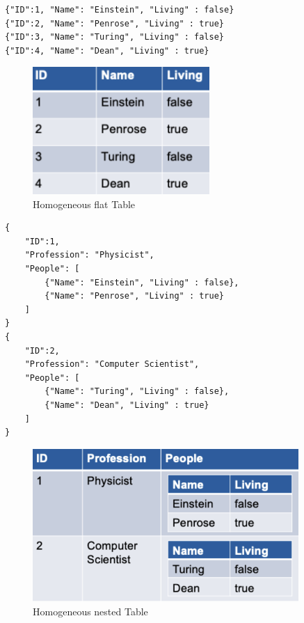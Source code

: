 \begin{minipage}{0.55\textwidth}
\vspace{1\baselineskip}
\begin{lstlisting}[style=json,caption={JSON Code for a homogeneous and flat table.}]
{"ID":1, "Name": "Einstein", "Living" : false}
{"ID":2, "Name": "Penrose", "Living" : true}
{"ID":3, "Name": "Turing", "Living" : false}
{"ID":4, "Name": "Dean", "Living" : true}
\end{lstlisting}
\end{minipage}
\hfill
\begin{minipage}{0.45\textwidth}
\begin{figure}[H]
    \centering
    \includegraphics[width=0.6\textwidth]{Figures/FlatHomogeneous.png}
    \caption{Homogeneous flat Table}
\end{figure}
\end{minipage}

\begin{minipage}{0.55\textwidth}
\vspace{1\baselineskip}
\begin{lstlisting}[style=json,caption={JSON Code for a homogeneous and nested table.}]
{
    "ID":1,
    "Profession": "Physicist",
    "People": [
        {"Name": "Einstein", "Living" : false},
        {"Name": "Penrose", "Living" : true}
    ]
}
{
    "ID":2,
    "Profession": "Computer Scientist",
    "People": [
        {"Name": "Turing", "Living" : false},
        {"Name": "Dean", "Living" : true}
    ]
}
\end{lstlisting}
\end{minipage}
\hfill
\begin{minipage}{0.45\textwidth}
\begin{figure}[H]
    \centering
    \includegraphics[width=0.9\textwidth]{Figures/NestedHomogeneous.png}
    \caption{Homogeneous nested Table}
\end{figure}
\end{minipage}


